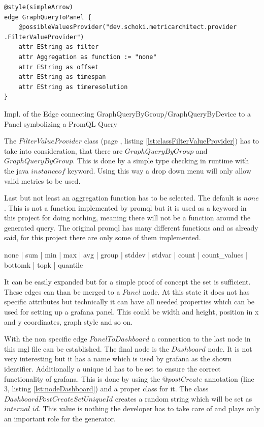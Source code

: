 \begin{listing}[H]
	\begin{verbatim}
@style(simpleArrow)
edge GraphQueryToPanel {
	@possibleValuesProvider("dev.schoki.metricarchitect.provider .FilterValueProvider")
	attr EString as filter
	attr Aggregation as function := "none"
	attr EString as offset
	attr EString as timespan
	attr EString as timeresolution
}
	\end{verbatim}
	\caption{Impl. of the Edge connecting GraphQueryByGroup/GraphQueryByDevice to a Panel symbolizing a PromQL Query}
	\label{lst:GraphQueryToPanel}
\end{listing}

The $FilterValueProvider$ class (page \pageref{lst:classFilterValueProvider}, listing \ref{lst:classFilterValueProvider}) has to take into consideration, that there are $GraphQueryByGroup$ and $GraphQueryByGroup$. This is done by a simple type checking in runtime with the java $instanceof$ keyword. Using this way a drop down menu will only allow valid metrics to be used.

Last but not least an aggregation function has to be selected. The default is $none$. This is not a function implemented by \gls{promql} but it is used as a keyword in this project for doing nothing, meaning there will not be a function around the generated query. The original \gls{promql} has many different functions and as already said, for this project there are only some of them implemented. 

\begin{center}
	none | sum | min | max | avg | group | stddev | stdvar | count | count\_values | bottomk | topk  | quantile
\end{center}

It can be easily expanded but for a simple proof of concept the set is sufficient. These edges can than be merged to a $Panel$ node. At this state it does not has specific attributes but technically it can have all needed properties which can be used for setting up a grafana panel. This could be width and height, position in x and y coordinates, graph style and so on.

With the non specific edge $PanelToDashboard$ a connection to the last node in this \gls{mgl} file can be established. The final node is the $Dashboard$ node. It is not very interesting but it has a name which is used by grafana as the shown identifier. Additionally a unique id has to be set to ensure the correct functionality of grafana. This is done by using the $@postCreate$ annotation (line 3, listing \ref{lst:nodeDashboard}) and a proper class for it. The class $DashboardPostCreateSetUniqueId$ creates a random string which will be set as $internal\_id$. This value is nothing the developer has to take care of and plays only an important role for the generator.

